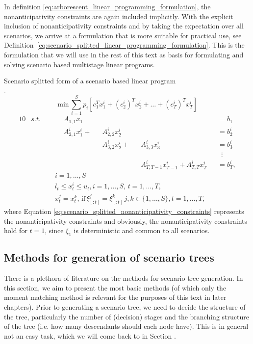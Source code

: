 In definition \ref{eq:arborescent_linear_programming_formulation}, the nonanticipativity constraints are again included implicitly. With the explicit inclusion of nonanticipativity constraints and by taking the expectation over all scenarios, we arrive at a formulation that is more suitable for practical use, see Definition~\ref{eq:scenario_splitted_linear_programming_formulation}. This is the formulation that we will use in the rest of this text as basis for formulating and solving scenario based multistage linear programs.
\begin{defn}
\label{eq:scenario_splitted_linear_programming_formulation}
{Scenario splitted form of a scenario based linear program \\ \cite{defourny_scenario_trees_scenario_splitted_formulation}}.
\footnotesize
\begin{equation*}
\mathrm{min} \, \sum_{i=1}^S p_i \left[ c_1^Tx_1^i + (c_2^i)^Tx_2^i + \dots + (c_T^i)^Tx_T^i  \right]
\end{equation*}
\vspace{-0.5cm}
\begin{alignat}{10}
& s.t. && \, && A_{1,1}x_1 && && \,&&=b_1 \nonumber \\
& && && A_{2,1}^ix_1^i  + &&A_{2,2}^ix_2^i && &&=b_2^i \nonumber \\
& && && && A_{3,2}^ix_{2}^i  + && A_{3,3}^ix_{3}^i &&=b_3^i \nonumber \\
& && && && && &&  \, \, \, \vdots \nonumber \\
& && && && && A_{T,T-1}^ix_{T-1}^i  +  A_{T,T}^ix_{T}^i &&=b_{T}^i, \nonumber
\end{alignat}
\vspace{-0.5cm}
\begin{align}
\label{eq:scenario_splitted_nonanticipativity_constraints}
& i=1,\dots,S \nonumber \\
& l_t \leq x_{t}^i \leq u_t, i=1,\dots,S, \, t=1,\dots,T,  \nonumber \\
& x_t^j=x_t^k, \, \mathrm{if} \, \xi_{[:t]}^j=\xi_{[:t]}^k \, j,k \in \{1,\dots,S\} , t=1,\dots,T,
\end{align}
\normalsize
where Equation \ref{eq:scenario_splitted_nonanticipativity_constraints} represents the nonanticipativity constraints and obviously, the nonanticipativity constraints hold for $t=1$, since $\xi_1$ is deterministic and common to all scenarios.
\end{defn}
\subsection{Methods for generation of scenario trees}
There is a plethora of literature on the methods for scenario tree generation. In this section, we aim to present the most basic methods (of which only the moment matching method is relevant for the purposes of this text in later chapters). Prior to generating a scenario tree, we need to decide the structure of the tree, particularly the number of (decision) stages and the branching structure of the tree (i.e. how many descendants should each node have). This is in general not an easy task, which we will come back to in Section .
